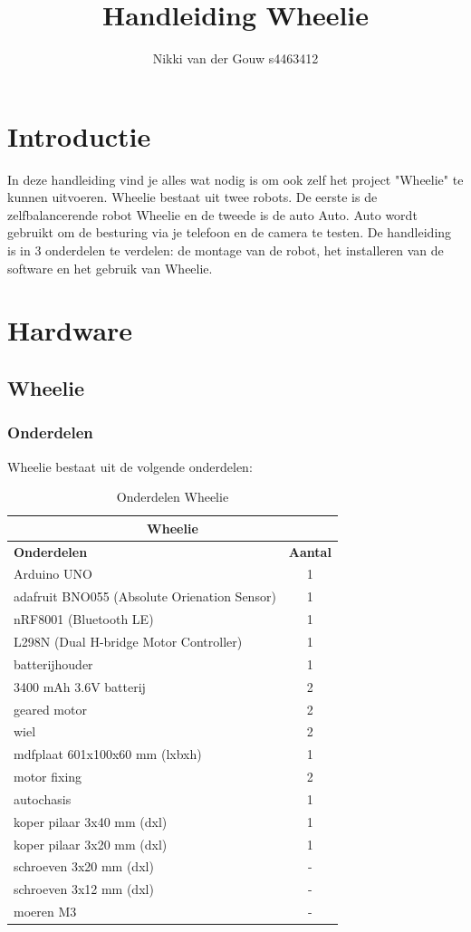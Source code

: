 \documentclass[12pt,a4paper]{article}
\author{Nikki van der Gouw s4463412}
\title{Handleiding Wheelie}
\begin{document}
\maketitle
\newpage
\tableofcontents
\newpage

\section{Introductie}
In deze handleiding vind je alles wat nodig is om ook zelf het project "Wheelie" te kunnen uitvoeren. Wheelie bestaat uit twee robots. De eerste is de zelfbalancerende robot Wheelie en de tweede is de auto Auto. Auto wordt gebruikt om de besturing via je telefoon en de camera te testen. De handleiding is in 3 onderdelen te verdelen: de montage van de robot, het installeren van de software en het gebruik van Wheelie.

\section{Hardware}
\subsection{Wheelie}
\subsubsection{Onderdelen}
Wheelie bestaat uit de volgende onderdelen:

\begin{table}[!h]	
	\begin{tabular}{|l|c|}
		\hline \multicolumn{2}{|c|}{\textbf{Wheelie}}	\\	
		\hline \textbf{Onderdelen} & \textbf{Aantal} \\ 
		\hline Arduino UNO & 1 \\ 
		\hline adafruit BNO055 (Absolute Orienation Sensor) & 1 \\ 
		\hline  nRF8001 (Bluetooth LE) & 1  \\ 
		\hline L298N (Dual H-bridge Motor Controller) & 1 \\
		\hline  batterijhouder & 1  \\ 
		\hline 3400 mAh 3.6V batterij & 2 \\ 
		\hline  geared motor & 2 \\
		\hline  wiel	 & 2 \\
		\hline 	mdfplaat 601x100x60 mm (lxbxh) & 1 \\
		\hline  motor fixing & 2 \\
		\hline  autochasis & 1 \\
		\hline	koper pilaar 3x40 mm (dxl) & 1 \\
		\hline 	koper pilaar 3x20 mm (dxl) & 1 \\
		\hline 	schroeven 3x20 mm (dxl) & - \\
		\hline 	schroeven 3x12 mm (dxl) & - \\
		\hline  moeren M3 & - \\
		\hline	
	\end{tabular} 
	\caption{Onderdelen Wheelie}
	\label{tbl:Onderdelen_wheelie}
\end{table}
\end{document}
